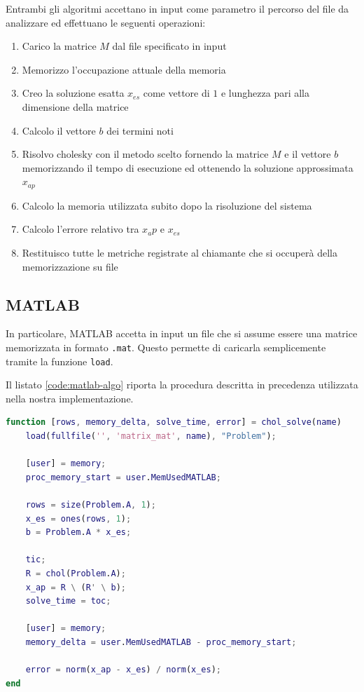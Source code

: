 \documentclass[11pt,italian]{article}
\begin{document}
Entrambi gli algoritmi accettano in input come parametro il percorso del file da analizzare ed effettuano le seguenti operazioni:
\begin{enumerate}
    \item Carico la matrice $M$ dal file specificato in input
    \item Memorizzo l'occupazione attuale della memoria
    \item Creo la soluzione esatta $x_{es}$ come vettore di $1$ e lunghezza pari alla dimensione della matrice
    \item Calcolo il vettore $b$ dei termini noti
    \item Risolvo cholesky con il metodo scelto fornendo la matrice $M$ e il vettore $b$ memorizzando il tempo di esecuzione ed ottenendo la soluzione approssimata $x_{ap}$
    \item Calcolo la memoria utilizzata subito dopo la risoluzione del sistema
    \item Calcolo l'errore relativo tra $x_ap$ e $x_{es}$
    \item Restituisco tutte le metriche registrate al chiamante che si occuperà della memorizzazione su file
\end{enumerate}

\subsection{MATLAB}
In particolare, MATLAB accetta in input un file che si assume essere una matrice memorizzata in formato \lstinline{.mat}. Questo permette di caricarla semplicemente tramite la funzione \lstinline{load}.

Il listato \ref{code:matlab-algo} riporta la procedura descritta in precedenza utilizzata nella nostra implementazione.

\newpage
\begin{lstlisting}[language=Matlab,emph={ones},caption=MATLAB: Algoritmo principale,label=code:matlab-algo]
function [rows, memory_delta, solve_time, error] = chol_solve(name)
    load(fullfile('', 'matrix_mat', name), "Problem");

    [user] = memory;
    proc_memory_start = user.MemUsedMATLAB;

    rows = size(Problem.A, 1);
    x_es = ones(rows, 1);
    b = Problem.A * x_es;

    tic;
    R = chol(Problem.A);
    x_ap = R \ (R' \ b);
    solve_time = toc;

    [user] = memory;
    memory_delta = user.MemUsedMATLAB - proc_memory_start;

    error = norm(x_ap - x_es) / norm(x_es);
end
\end{lstlisting}
\end{document}

